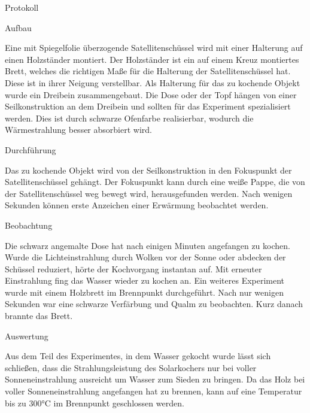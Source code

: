 
Protokoll

Aufbau

Eine mit Spiegelfolie überzogende Satellitenschüssel wird mit einer Halterung auf einen Holzständer montiert. Der Holzständer ist ein auf einem Kreuz montiertes Brett, welches die richtigen Maße für die Halterung der Satellitenschüssel hat. Diese ist in ihrer Neigung verstellbar. Als Halterung für das zu kochende Objekt wurde ein Dreibein zusammengebaut. Die Dose oder der Topf hängen von einer Seilkonstruktion an dem Dreibein und sollten für das Experiment spezialisiert werden. Dies ist durch schwarze Ofenfarbe realisierbar, wodurch die Wärmestrahlung besser absorbiert wird. 


Durchführung

Das zu kochende Objekt wird von der Seilkonstruktion in den Fokuspunkt der Satellitenschüssel gehängt. Der Fokuspunkt kann durch eine weiße Pappe, die von der Satellitenschüssel weg bewegt wird, herausgefunden werden. Nach wenigen Sekunden können erste Anzeichen einer Erwärmung beobachtet werden.


Beobachtung

Die schwarz angemalte Dose hat nach einigen Minuten angefangen zu kochen. Wurde die Lichteinstrahlung durch Wolken vor der Sonne oder abdecken der Schüssel reduziert, hörte der Kochvorgang instantan auf. Mit erneuter Einstrahlung fing das Wasser wieder zu kochen an. 
Ein weiteres Experiment wurde mit einem Holzbrett im Brennpunkt durchgeführt. Nach nur wenigen Sekunden war eine schwarze Verfärbung und Qualm zu beobachten. Kurz danach brannte das Brett.



Auswertung

Aus dem Teil des Experimentes, in dem Wasser gekocht wurde lässt sich schließen, dass die Strahlungsleistung des Solarkochers nur bei voller Sonneneinstrahlung ausreicht um Wasser zum Sieden zu bringen.
Da das Holz bei voller Sonneneinstrahlung angefangen hat zu brennen, kann auf eine Temperatur bis zu 300°C im Brennpunkt geschlossen werden.
